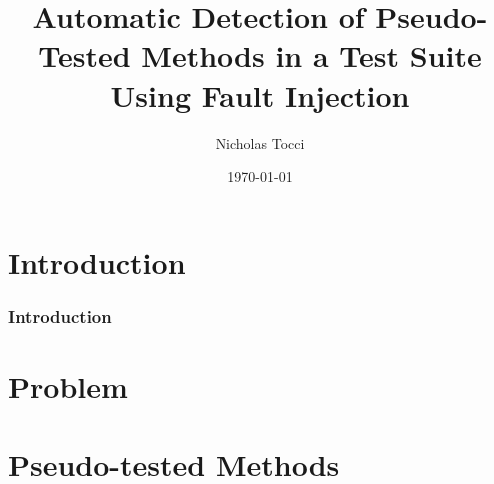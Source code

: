 \documentclass{beamer}
\title{Automatic Detection of Pseudo-Tested Methods in a Test Suite Using Fault Injection}
\author{Nicholas Tocci}
\date{\today}
\begin{document}
\section{Introduction}
\begin{frame}
	\frametitle{Introduction}
	\titlepage
\end{frame}
\section{Problem}
\label{sec:problem}


\section{Pseudo-tested Methods}
\label{sec:pseudo-tested methods}

\end{document}
